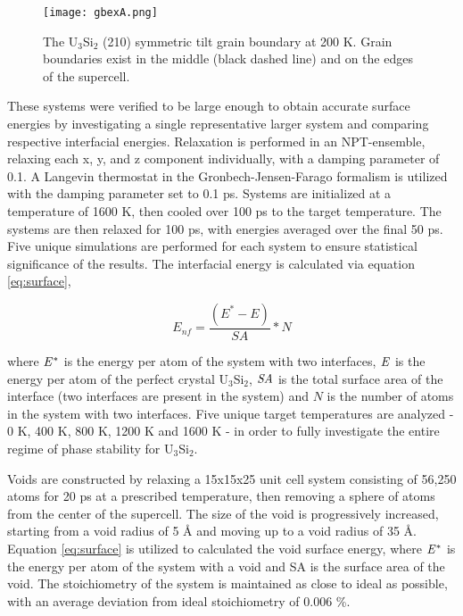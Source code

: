 \documentclass[review]{elsarticle}
\begin{document}
\begin{figure}[h]
 \centering
 \texttt{[image: gbexA.png]} 
 \caption{The U$_{3}$Si$_{2}$ (210) symmetric tilt grain boundary at 200 K. Grain boundaries exist in the middle (black dashed line) and on the edges of the supercell. }
 \label{fig:gbex}
\end{figure}

These systems were verified to be large enough to obtain accurate surface energies by investigating a single representative larger system and comparing respective interfacial energies. Relaxation is performed in an NPT-ensemble, relaxing each x, y, and z component individually, with a damping parameter of 0.1. A Langevin thermostat in the Gronbech-Jensen-Farago \cite{gjf2014} formalism is utilized with the damping parameter set to 0.1 ps. Systems are initialized at a temperature of 1600 K, then cooled over 100 ps to the target temperature. The systems are then relaxed for 100 ps, with energies averaged over the final 50 ps. Five unique simulations are performed for each system to ensure statistical significance of the results. The interfacial energy is calculated via equation \ref{eq:surface},

\begin{equation}
\label{eq:surface}
E_{nf}= \frac{(E^{*} - E)}{SA} * N
\end{equation}

where $\it{E^{*}}$ is the energy per atom of the system with two interfaces, $\it{E}$ is the energy per atom of the perfect crystal U$_{3}$Si$_{2}$, $\it{SA}$ is the total surface area of the interface (two interfaces are present in the system) and $\textit{N}$ is the number of atoms in the system with two interfaces. Five unique target temperatures are analyzed - 0 K, 400 K, 800 K, 1200 K and 1600 K - in order to fully investigate the entire regime of phase stability for U$_{3}$Si$_{2}$. 

Voids are constructed by relaxing a 15x15x25 unit cell system consisting of 56,250 atoms for 20 ps at a prescribed temperature, then removing a sphere of atoms from the center of the supercell. The size of the void is progressively increased, starting from a void radius of 5 {\AA} and moving up to a void radius of 35 {\AA}. Equation \ref{eq:surface} is utilized to calculated the void surface energy, where $\it{E^{*}}$ is the energy per atom of the system with a void and SA is the surface area of the void. The stoichiometry of the system is maintained as close to ideal as possible, with an average deviation from ideal stoichiometry of 0.006 {\%}. 
\end{document}
